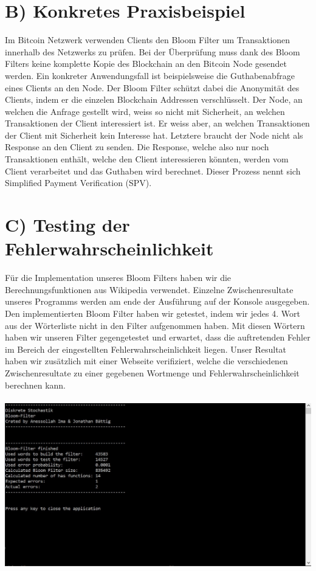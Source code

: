 \documentclass[a4paper, 11pt]{article}
\begin{document}
\section*{B) Konkretes Praxisbeispiel}
Im Bitcoin Netzwerk verwenden Clients den Bloom Filter um Transaktionen innerhalb des Netzwerks zu prüfen. Bei der Überprüfung muss dank des Bloom Filters keine komplette Kopie des Blockchain an den Bitcoin Node gesendet werden. Ein konkreter Anwendungsfall ist beispielsweise die Guthabenabfrage eines Clients an den Node. Der Bloom Filter schützt dabei die Anonymität des Clients, indem er die einzelen Blockchain Addressen verschlüsselt. Der Node, an welchen die Anfrage gestellt wird, weiss so nicht mit Sicherheit, an welchen Transaktionen der Client interessiert ist. Er weiss aber, an welchen Transaktionen der Client mit Sicherheit kein Interesse hat. Letztere braucht der Node nicht als Response an den Client zu senden. Die Response, welche also nur noch Transaktionen enthält, welche den Client interessieren könnten, werden vom Client verarbeitet und das Guthaben wird berechnet. Dieser Prozess nennt sich Simplified Payment Verification (SPV).
\cite{TheMorpheusTutorials}
\newpage

\section*{C) Testing der Fehlerwahrscheinlichkeit}
Für die Implementation unseres Bloom Filters haben wir die Berechnungsfunktionen aus Wikipedia verwendet. Einzelne Zwischenresultate unseres Programms werden am ende der Ausführung auf der Konsole ausgegeben. Den implementierten Bloom Filter haben wir getestet, indem wir jedes 4. Wort aus der Wörterliste nicht in den Filter aufgenommen haben. Mit diesen Wörtern haben wir unseren Filter gegengetestet und erwartet, dass die auftretenden Fehler im Bereich der eingestellten Fehlerwahrscheinlichkeit liegen. Unser Resultat haben wir zusätzlich mit einer Webseite verifiziert, welche die verschiedenen Zwischenresultate zu einer gegebenen Wortmenge und Fehlerwahrscheinlichkeit berechnen kann.
\cite{Testsite} \\ \\
\includegraphics[width=\textwidth]{Program.jpg}
\end{document}
